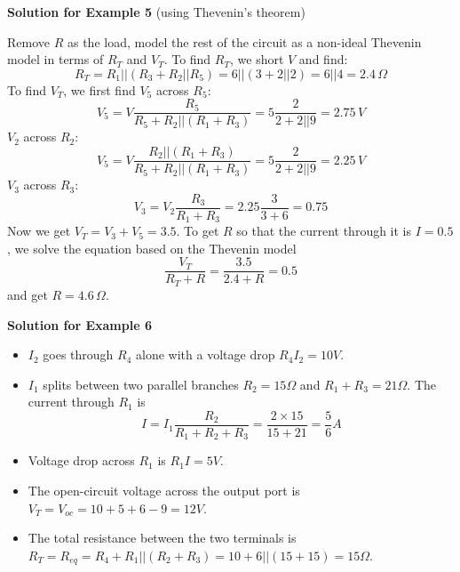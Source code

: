 \usepackage{html}



{\bf Solution for Example 5} (using Thevenin's theorem)

Remove $R$ as the load, model the rest of the circuit as a non-ideal
Thevenin model in terms of $R_T$ and $V_T$. To find $R_T$, we short $V$
and find:
\begin{equation}
  R_T=R_1||(R_3+R_2||R_5)=6||(3+2||2)=6||4=2.4\,\Omega
\end{equation}
To find $V_T$, we first find $V_5$ across $R_5$:
\begin{equation}
  V_5=V\frac{R_5}{R_5+R_2||(R_1+R_3)}=5 \frac{2}{2+2||9}=2.75\,V
\end{equation}
$V_2$ across $R_2$:
\begin{equation}
  V_5=V\frac{R_2||(R_1+R_3)}{R_5+R_2||(R_1+R_3)}=5 \frac{2}{2+2||9}=2.25\,V
\end{equation}
$V_3$ across $R_3$:
\begin{equation}
  V_3=V_2\frac{R_3}{R_1+R_3}=2.25\frac{3}{3+6}=0.75
\end{equation}
Now we get $V_T=V_3+V_5=3.5$. To get $R$ so that the current through it is
$I=0.5$, we solve the equation based on the Thevenin model
\begin{equation}
  \frac{V_T}{R_T+R}=\frac{3.5}{2.4+R}=0.5
\end{equation}
and get $R=4.6\,\Omega$.

{\bf Solution for Example 6}

\begin{itemize}
\item $I_2$ goes through $R_4$ alone with a voltage drop $R_4I_2=10V$.
\item $I_1$ splits between two parallel branches $R_2=15\Omega$ and 
  $R_1+R_3=21\Omega$. The current through $R_1$ is 
  \begin{equation}
    I=I_1\frac{R_2}{R_1+R_2+R_3}=\frac{2\times 15}{15+21}=\frac{5}{6}A
  \end{equation}
\item Voltage drop across $R_1$ is $R_1I=5V$.
\item The open-circuit voltage across the output port is
  $V_T=V_{oc}=10+5+6-9=12V$.
\item The total resistance between the two terminals is
  $R_T=R_{eq}=R_4+R_1||(R_2+R_3)=10+6||(15+15)=15\Omega$.
\end{itemize}








